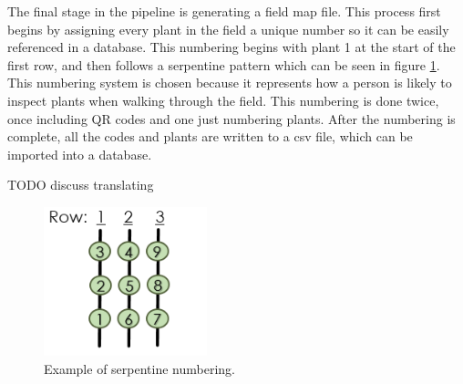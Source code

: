 The final stage in the pipeline is generating a field map file.  This process first begins by assigning every plant in the field a unique number so it can be easily referenced in a database.  This numbering begins with plant 1 at the start of the first row, and then follows a serpentine pattern which can be seen in figure \ref{figure:serpentine}. This numbering system is chosen because it represents how a person is likely to inspect plants when walking through the field.  This numbering is done twice, once including QR codes and one just numbering plants.  After the numbering is complete, all the codes and plants are written to a \ac{csv} file, which can be imported into a database.

TODO discuss translating

\begin{figure}[hb]
	\centering
    \includegraphics[height=1.7in]{figures/sepentine.png}
    \caption[Serpentine numbering]{Example of serpentine numbering.}
    \label{figure:serpentine}
\end{figure}


